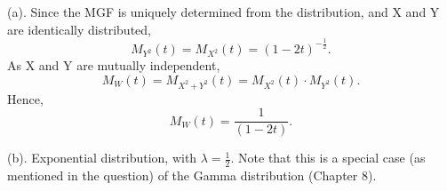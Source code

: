 (a). Since the MGF is uniquely determined from the distribution, and X and Y are identically distributed, \[M_{Y^2}(t) = M_{X^2}(t) = (1-2t)^{-\frac{1}{2}}.\]
As X and Y are mutually independent, \[M_{W}(t) = M_{X^2+Y^2}(t) =  M_{X^2}(t) \cdot M_{Y^2}(t).\]
Hence,
\[M_{W}(t) = \frac{1}{(1-2t)}.\]

(b). Exponential distribution, with \(\lambda =\frac{1}{2}\). Note that this is a special case (as mentioned in the question) of the Gamma distribution (Chapter 8).
